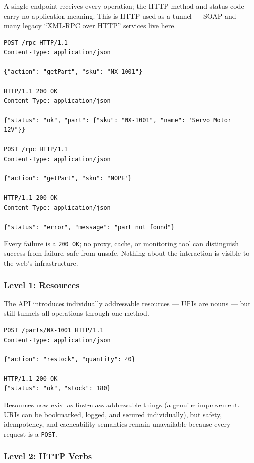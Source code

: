 A single endpoint receives every operation; the HTTP method and status code carry
no application meaning. This is HTTP used as a tunnel --- SOAP and many legacy
``XML-RPC over HTTP'' services live here.

\begin{verbatim}
POST /rpc HTTP/1.1
Content-Type: application/json

{"action": "getPart", "sku": "NX-1001"}

HTTP/1.1 200 OK
Content-Type: application/json

{"status": "ok", "part": {"sku": "NX-1001", "name": "Servo Motor 12V"}}

POST /rpc HTTP/1.1
Content-Type: application/json

{"action": "getPart", "sku": "NOPE"}

HTTP/1.1 200 OK
Content-Type: application/json

{"status": "error", "message": "part not found"}
\end{verbatim}

Every failure is a \texttt{200 OK}; no proxy, cache, or monitoring tool can
distinguish success from failure, safe from unsafe. Nothing about the interaction
is visible to the web's infrastructure.

\subsubsection{Level 1: Resources}

The API introduces individually addressable resources --- URIs are nouns --- but
still tunnels all operations through one method.

\begin{verbatim}
POST /parts/NX-1001 HTTP/1.1
Content-Type: application/json

{"action": "restock", "quantity": 40}

HTTP/1.1 200 OK
{"status": "ok", "stock": 180}
\end{verbatim}

Resources now exist as first-class addressable things (a genuine improvement:
URIs can be bookmarked, logged, and secured individually), but safety,
idempotency, and cacheability semantics remain unavailable because every request
is a \texttt{POST}.

\subsubsection{Level 2: HTTP Verbs}

